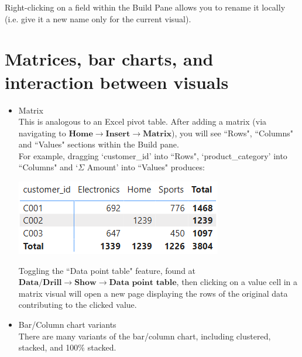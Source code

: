 \documentclass[10pt, openany, twocolumn]{book}
\begin{document}
Right-clicking on a field within the Build Pane allows you to rename it locally (i.e. give it a new name only for the current visual).\\

\section{Matrices, bar charts, and interaction between visuals}

\begin{itemize}
    \item Matrix \\
    This is analogous to an Excel pivot table. After adding a matrix (via navigating to $\textbf{Home} \rightarrow \textbf{Insert} \rightarrow \textbf{Matrix}$), you will see ``Rows", ``Columns" and ``Values" sections within the Build pane.\\
    
    For example, dragging `customer\_id' into ``Rows", `product\_category' into ``Columns" and `$\Sigma$ Amount' into ``Values" produces:
    \begin{center}
        \includegraphics[width = 0.9\columnwidth]{images/matrix_example.png}
    \end{center}
    
    Toggling the ``Data point table" feature, found at $\textbf{Data/Drill} \rightarrow \textbf{Show} \rightarrow \textbf{Data point table}$, then clicking on a value cell in a matrix visual will open a new page displaying the rows of the original data contributing to the clicked value.

    \item Bar/Column chart variants\\
    There are many variants of the bar/column chart, including clustered, stacked, and 100\% stacked.
\end{itemize}
\end{document}
